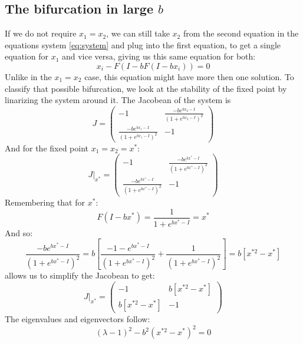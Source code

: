\documentclass{article}
\begin{document}
\subsection{The bifurcation in large $b$}
If we do not require $x_1 = x_2$, we can still take $x_2$ from the second equation in the equations system \ref{eq:system} and plug into the first equation, to get a single equation for $x_1$ and vice versa, giving us this same equation for both:
\begin{equation}
    x_i - F(I - bF(I - bx_i)) = 0
\end{equation}
Unlike in the $x_1 = x_2$ case, this equation might have more then one solution. To classify that possible bifurcation, we look at the stability of the fixed point by linarizing the system around it. The Jacobean of the system is
\begin{equation}
    J = \begin{pmatrix}
        -1 & \frac{-be^{bx_2-I}}{(1 + e^{bx_2-I})^2} \\ \frac{-be^{bx_1-I}}{(1 + e^{bx_1-I})^2} & -1
    \end{pmatrix}
\end{equation}
And for the fixed point $x_1 = x_2 = x^*$:
\begin{equation}
    J|_{x^*} = \begin{pmatrix}
        -1 & \frac{-be^{bx^*-I}}{(1 + e^{bx^*-I})^2} \\ \frac{-be^{bx^*-I}}{(1 + e^{bx^*-I})^2} & -1
    \end{pmatrix}
\end{equation}
Remembering that for $x^*$:
\begin{equation}
    F(I - bx^*) = \frac{1}{1 + e^{bx^*-I}} = x^*
\end{equation}
And so:
\begin{equation}
    \frac{-be^{bx^*-I}}{(1 + e^{bx^*-I})^2} =
    b\left[\frac{-1-e^{bx^*-I}}{(1 + e^{bx^*-I})^2} + \frac{1}{(1 + e^{bx^*-I})^2}\right] = b\left[x^{*2} - x^*\right]
\end{equation}
allows us to simplify the Jacobean to get:
\begin{equation}
    J|_{x^*} = \begin{pmatrix}
        -1 & b\left[x^{*2} - x^*\right] \\ b\left[x^{*2} - x^*\right] & -1
    \end{pmatrix}
\end{equation}
The eigenvalues and eigenvectors follow:
\begin{equation}
    \left(\lambda - 1\right)^2 - b^2\left(x^{*2} - x^*\right)^2 = 0
\end{equation}
\end{document}
